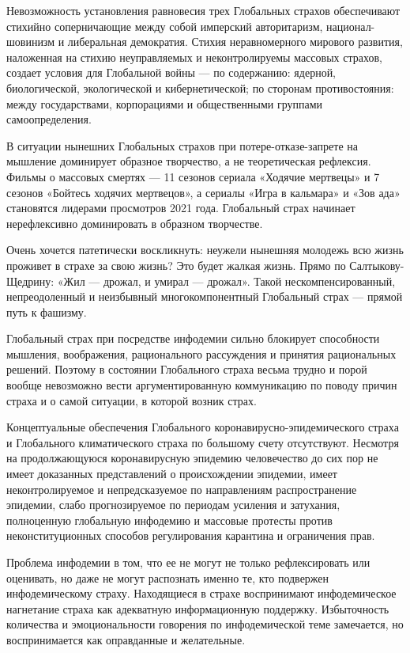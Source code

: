 Невозможность установления равновесия трех Глобальных страхов обеспечивают
стихийно соперничающие между собой имперский авторитаризм, национал-шовинизм и
либеральная демократия. Стихия неравномерного мирового развития, наложенная на
стихию неуправляемых и неконтролируемы массовых страхов, создает условия для
Глобальной войны — по содержанию: ядерной, биологической, экологической и
кибернетической; по сторонам противостояния: между государствами, корпорациями
и общественными группами самоопределения.

В ситуации нынешних Глобальных страхов при потере-отказе-запрете на мышление
доминирует образное творчество, а не теоретическая рефлексия. Фильмы о массовых
смертях — 11 сезонов сериала «Ходячие мертвецы» и 7 сезонов «Бойтесь ходячих
мертвецов», а сериалы «Игра в кальмара» и «Зов ада» становятся лидерами
просмотров 2021 года. Глобальный страх начинает нерефлексивно доминировать в
образном творчестве.

Очень хочется патетически воскликнуть: неужели нынешняя молодежь всю жизнь
проживет в страхе за свою жизнь? Это будет жалкая жизнь. Прямо по
Салтыкову-Щедрину: «Жил — дрожал, и умирал — дрожал». Такой
нескомпенсированный, непреодоленный и неизбывный многокомпонентный Глобальный
страх — прямой путь к фашизму.

Глобальный страх при посредстве инфодемии сильно блокирует способности
мышления, воображения, рационального рассуждения и принятия рациональных
решений. Поэтому в состоянии Глобального страха весьма трудно и порой вообще
невозможно вести аргументированную коммуникацию по поводу причин страха и о
самой ситуации, в которой возник страх.

Концептуальные обеспечения Глобального коронавирусно-эпидемического страха и
Глобального климатического страха по большому счету отсутствуют. Несмотря на
продолжающуюся коронавирусную эпидемию человечество до сих пор не имеет
доказанных представлений о происхождении эпидемии, имеет неконтролируемое и
непредсказуемое по направлениям распространение эпидемии, слабо прогнозируемое
по периодам усиления и затухания, полноценную глобальную инфодемию и массовые
протесты против неконституционных способов регулирования карантина и
ограничения прав.

Проблема инфодемии в том, что ее не могут не только рефлексировать или
оценивать, но даже не могут распознать именно те, кто подвержен инфодемическому
страху. Находящиеся в страхе воспринимают инфодемическое нагнетание страха как
адекватную информационную поддержку. Избыточность количества и эмоциональности
говорения по инфодемической теме замечается, но воспринимается как оправданные
и желательные.

